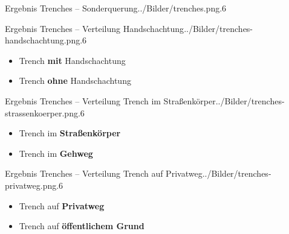 \documentclass[11pt, dvipsnames,aspectratio=169]{beamer}
\newcommand\colorrule[1]{\tikz{\draw[white,opacity=0] (0,0) -- (0,-.08);\draw[white,opacity=0] (0,0) -- (.58,0);\fill[#1] (0,0) rectangle (.51,.08);}}
\begin{document}
\begin{mapframe}{Ergebnis Trenches -- Sonderquerung}{../Bilder/trenches.png}{.6\textwidth}
	\centering
	 \\
	\tiny \sonderquerung
\end{mapframe}

\begin{mapframe}{Ergebnis Trenches -- Verteilung Handschachtung}{../Bilder/trenches-handschachtung.png}{.6\textwidth}
	\begin{itemize}
		\item[\colorrule{trenchgreen}] Trench \textbf{mit} Handschachtung
		\item[\colorrule{trenchblack}] Trench \textbf{ohne} Handschachtung
	\end{itemize}
\end{mapframe}

\begin{mapframe}{Ergebnis Trenches -- Verteilung Trench im Straßenkörper}{../Bilder/trenches-strassenkoerper.png}{.6\textwidth}
	\begin{itemize}
		\item[\colorrule{trenchred}] Trench im \textbf{Straßenkörper}
		\item[\colorrule{trenchblack}] Trench im \textbf{Gehweg}
	\end{itemize}
\end{mapframe}

\begin{mapframe}{Ergebnis Trenches -- Verteilung Trench auf Privatweg}{../Bilder/trenches-privatweg.png}{.6\textwidth}
	\begin{itemize}
		\item[\colorrule{trenchblue}] Trench auf \textbf{Privatweg}
		\item[\colorrule{trenchblack}] Trench auf \textbf{öffentlichem Grund}
	\end{itemize}
\end{mapframe}
\end{document}
